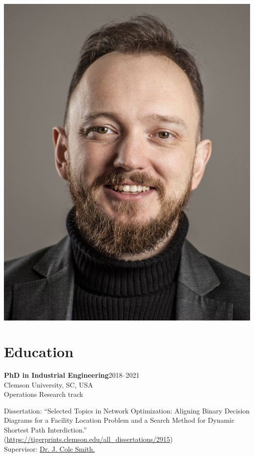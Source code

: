 \documentclass[11pt, a4paper]{article} \usepackage{geometry} %
\newcommand{\edu}[3]{
  \noindent\textbf{#1}\hfill #2\\
  #3\vspace{0.7em}}
\begin{document}
  \begin{minipage}{0.22\linewidth}
    \strut\vspace*{-\baselineskip}\newline
    \includegraphics[width=\textwidth]{Bochkarev.jpg}
  \end{minipage}

  \vspace{1.0em}

  \section*{Education}
  \edu{PhD in Industrial Engineering}{2018--2021}{
    Clemson University, SC, USA\\
    Operations Research track}

  \noindent Dissertation: ``Selected Topics in Network Optimization: Aligning
  Binary Decision\\ Diagrams for a Facility Location Problem and a Search Method
  for Dynamic\\Shortest Path Interdiction.''
  \noindent (\href{https://tigerprints.clemson.edu/all_dissertations/2915}{https://tigerprints.clemson.edu/all\_dissertations/2915})\\
  Supervisor:
  \href{https://scholar.google.com/citations?user=87CaUHYAAAAJ&hl=en}{Dr. J.
    Cole Smith.}\vspace{1.5em}
\end{document}
